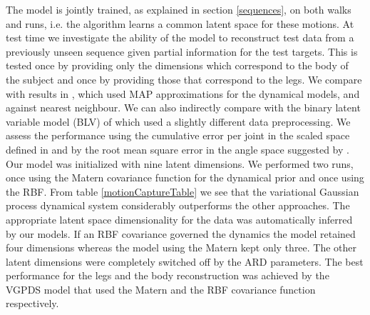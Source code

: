 \documentclass{article} %
\begin{document}
The model is jointly trained, as explained in section \ref{sequences},
on both walks and runs, i.e. the algorithm learns a common latent
space for these motions. At test time we investigate the ability of
the model to reconstruct test data from a previously unseen sequence
given partial information for the test targets. This is tested once by
providing only the dimensions which correspond to the body of the
subject and once by providing those that correspond to the legs.
%
We compare with results in \cite{gplvmLarger}, which used MAP
approximations for the dynamical models, and against nearest
neighbour. We can also indirectly compare with the binary latent
variable model (BLV) of \cite{Taylor} which used a slightly different
data preprocessing. We assess the performance using the cumulative
error per joint in the scaled space defined in \cite{Taylor} and by
the root mean square error in the angle space suggested by
\cite{gplvmLarger}. Our model was initialized with nine latent
dimensions. We performed two runs, once using the Matern covariance
function for the dynamical prior and once using the RBF. From table
\ref{motionCaptureTable} we see that the variational Gaussian process
dynamical system considerably outperforms the other approaches.
%
The appropriate latent space dimensionality for the data was
automatically inferred by our models. If an RBF covariance governed
the dynamics the model retained four dimensions whereas the model
using the Matern kept only three.
%
%
The other latent dimensions were completely switched off by the ARD
parameters.  The best performance for the legs and the body
reconstruction was achieved by the VGPDS model that used the Matern
and the RBF covariance function respectively.
\end{document}
